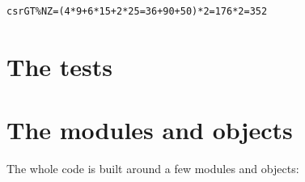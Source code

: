 \begin{small}
\begin{verbatim}
csrGT%NZ=(4*9+6*15+2*25=36+90+50)*2=176*2=352

\end{verbatim}
\end{small}

















\newpage
\section{The tests}



















\newpage
\section{The modules and objects}
The whole code is built around a few modules and objects:

